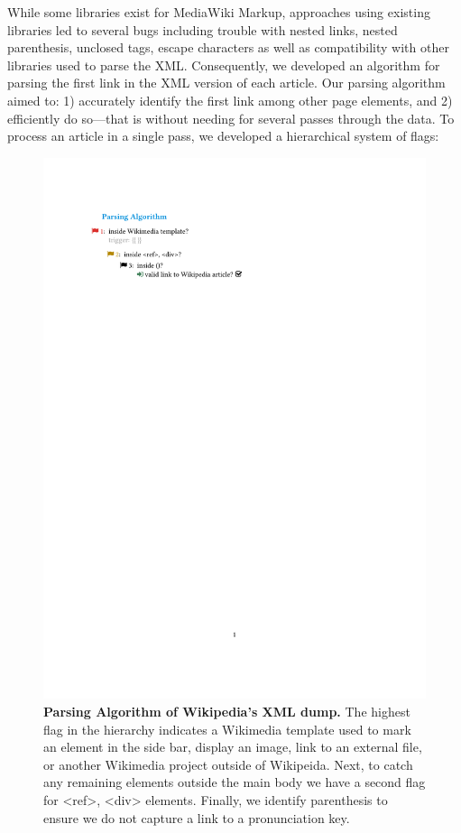 \documentclass[pre,twocolumn,twoside,superscriptaddress,floatfix]{revtex4-1}
\begin{document}
{While some libraries exist for MediaWiki Markup,
approaches using existing libraries led to several bugs 
including trouble with nested links, nested parenthesis, unclosed tags, escape characters 
as well as compatibility with other libraries used to parse the XML.
Consequently,  we developed an algorithm for parsing the first link in the XML version of each article.
Our parsing algorithm aimed to: 
1) accurately identify the first link among other page elements, and 
2) efficiently do so---that is without needing for several passes through the data.
To process an article in a single pass, we developed a hierarchical system of flags:
\begin{figure}[tp!]
  \includegraphics[width=\columnwidth]{flags.pdf}  
  \caption{
    \textbf{Parsing Algorithm of Wikipedia's XML dump.}
The highest flag in the hierarchy indicates a Wikimedia template used to mark an element in the side bar, display an image, link to an external file, or another Wikimedia project outside of Wikipeida. Next, to catch any remaining elements outside the main body we have a second flag for <ref>, <div> elements. Finally, we identify parenthesis to ensure we do not capture a link to a pronunciation key.}
  \label{fig:parsing algorithm}
\end{figure}

}
\end{document}
